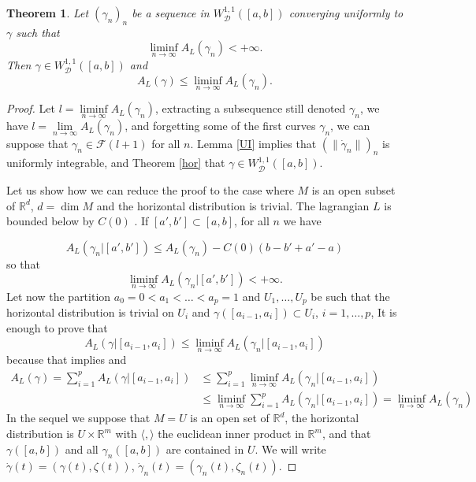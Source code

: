 \documentclass[12pt]{amsart}
\theoremstyle{plain}
\newtheorem{theorem}{Theorem}
\theoremstyle{definition}
\newcommand{\R}{\mathbb R}
\newcommand{\cD}{\mathcal D}
\newcommand{\cW}{W^{1,1}}
\newcommand{\cWD}{\cW_\cD}
\newcommand{\cF}{\mathcal F}
\newcommand{\ga}{\gamma}
\newcommand{\dga}{\dot\gamma}
\begin{document}
\begin{theorem}\label{Cle}
   Let $(\ga_n)_n$ be a sequence in $\cWD([a,b])$ converging uniformly to
   $\ga$ such that
   \[\liminf_{n\to\infty}A_L(\ga_n)<+\infty.\]
   Then $\ga\in\cWD([a,b])$ and
\[A_L(\ga)\le \liminf_{n\to\infty}A_L(\ga_n).\]
\end{theorem}
\begin{proof}
  
Let $l=\liminf\limits_{n\to\infty}A_L(\ga_n)$,  extracting a subsequence
still denoted $\ga_n$, we have  $l=\lim\limits_{n\to\infty}A_L(\ga_n)$, and forgetting some of the first curves $\ga_n$, 
we can suppose that $\ga_n\in\cF(l+1)$ for all $n$. 
Lemma \ref{UI} implies that $(\|\dga_n\|)_n$ 
is uniformly integrable, and Theorem \ref{hor} that $\ga\in\cWD([a,b])$.
  
Let us show how we can reduce the proof to the case where 
$M$ is an open subset of $\R^d$,  $d =\dim M$ and the horizontal 
distribution is trivial. The lagrangian $L$ is bounded
below by $C(0)$ . If $[a',b']\subset[a,b]$, for all $n$ we have

\[A_L(\ga_n|[a',b'])\le
  A_L(\ga_n)-C(0)(b-b'+a'-a)\]
so that
\[\liminf_{n\to\infty}A_L(\ga_n|[a',b'])<+\infty.\]
Let now the partition $a_0 = 0 < a_1 < \ldots < a_p = 1$ and
$U_1, \ldots, U_p$ be such that
the horizontal distribution is trivial on $U_i$  and
$\ga([a_{i-1},a_i])\subset U_i$, $i=1,\ldots,p$,
It is enough to prove that  
\[A_L(\ga|[a_{i-1},a_i])\le \liminf_{n\to\infty}A_L(\ga_n|[a_{i-1},a_i])\]
because that implies and 
\begin{align*}
  A_L(\ga) =\sum_{i=1}^pA_L(\ga|[a_{i-1},a_i]) &\le
\sum_{i=1}^p\liminf _{n\to\infty} A_L(\ga_n|[a_{i-1},a_i])\\
&\le \liminf_{n\to\infty}\sum_{i=1}^pA_L(\ga_n|[a_{i-1},a_i])=\liminf_{n\to\infty}A_L(\ga_n)
\end{align*}
In the sequel we suppose that $M=U$ is an open set of $\R^d$, the
horizontal distribution is $U\times\R^m$ with $\langle ,\rangle$ the
euclidean inner product in $\R^m$, and that $\ga([a,b])$ and 
all $\ga_n([a,b])$ are contained in $U$.
We will write $\dga(t)=(\ga(t), \zeta(t))$, $\dga_n(t)=(\ga_n(t), \zeta_n(t))$.


\end{proof}
\end{document}

